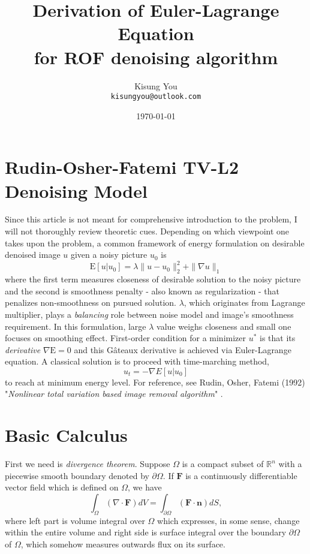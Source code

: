\documentclass[fontsize=12pt]{article}
\title{Derivation of Euler-Lagrange Equation \\for ROF denoising algorithm}
\author{
	Kisung You\\
	\texttt{kisungyou@outlook.com}
}
\date{\today}
\begin{document}
\maketitle

\section{Rudin-Osher-Fatemi TV-L2 Denoising Model}
Since {this article} is not meant for comprehensive introduction to the problem, I will not thoroughly review theoretic cues. Depending on which viewpoint one takes upon the problem, a common framework of energy formulation on desirable denoised image $u$ given a noisy picture  $u_0$ is 
\begin{equation}
\mathrm{E}[u|u_0] = \lambda \| u - u_0 \|_2^2 + \| \nabla u \|_1
\end{equation}
where the first term measures closeness of desirable solution to the noisy picture and the second is smoothness penalty - also known as regularization - that penalizes non-smoothness on pursued solution. $\lambda$, which originates from Lagrange multiplier, plays a \emph{balancing} role between noise model and image's smoothness requirement. In this formulation, large $\lambda$ value weighs closeness and small one focuses on smoothing effect. First-order condition for a minimizer $u^*$ is that its \textit{derivative} $\nabla \mathrm{E} = 0$ and this G\^{a}teaux derivative is achieved via Euler-Lagrange equation. A classical solution is to proceed with time-marching method,
\begin{equation}
u_t = - \nabla E[u|u_0]
\end{equation}
to reach at minimum energy level. For reference, see Rudin, Osher, Fatemi (1992) "\textit{Nonlinear total variation based image removal algorithm}" \cite{rudin_nonlinear_1992}.


\section{Basic Calculus}
First we need is \emph{divergence theorem}. Suppose $\Omega$ is a compact subset of $\mathbb{R}^n$ with a piecewise smooth boundary denoted by $\partial \Omega$. If $\mathbf{F}$ is a continuously differentiable vector field which is defined on $\Omega$, we have
\begin{equation}
\int_{\Omega} (\nabla \cdot \mathbf{F}) dV = \int_{\partial \Omega} (\mathbf{F}\cdot \mathbf{n}) dS,
\end{equation}
where left part is volume integral over $\Omega$ which expresses, in some sense, change within the entire volume and right side is surface integral over the boundary $\partial \Omega$ of $\Omega$, which somehow measures outwards flux on its surface. 
\end{document}
